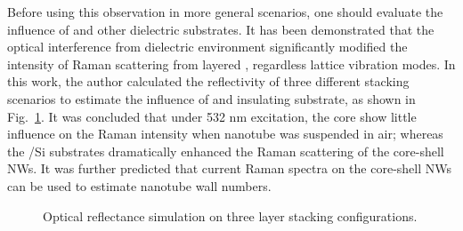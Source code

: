Before using this observation in more general scenarios, one should evaluate the influence of  and other dielectric substrates. It has been demonstrated that the optical interference from dielectric environment significantly modified the intensity of Raman scattering from layered , regardless lattice vibration modes.\cite{Li2012} In this work, the author calculated the reflectivity of three different stacking scenarios to estimate the influence of  and insulating substrate, as shown in Fig.~\ref{fig:ch5ws2stk}. It was concluded that under 532 nm excitation, the  core show little influence on the Raman intensity when  nanotube was suspended in air; whereas the /Si substrates dramatically enhanced the Raman scattering of the core-shell NWs. It was further predicted that current Raman spectra on the core-shell NWs can be used to estimate  nanotube wall numbers. 

\begin{figure}[htb]
\centering
{}\hspace{0.03\textwidth}
\hspace{0.03\textwidth}
\caption[Optical reflectance simulation on three stacking configurations]{Optical reflectance simulation on three   layer stacking configurations.}
\label{fig:ch5ws2stk}
\end{figure}

